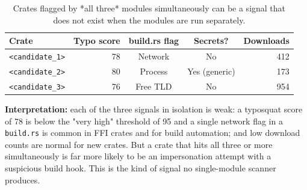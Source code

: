 \begin{table}[ht]
\centering
\caption{Crates flagged by *all three* modules simultaneously can be a signal that does not exist when the modules are run separately.}\label{tab:cross-module}
\begin{tabular}{|l|r|c|c|r|}
\hline
\textbf{Crate} & \textbf{Typo score} & \textbf{build.rs flag} & \textbf{Secrets?} & \textbf{Downloads} \\
\hline
\texttt{<candidate\_1>} & 78 & Network & No & 412 \\
\texttt{<candidate\_2>} & 80 & Process & Yes (generic) & 173 \\
\texttt{<candidate\_3>} & 76 & Free TLD & No & 954 \\
\hline
\end{tabular}
\end{table}

\textbf{Interpretation:} each of the three signals in isolation is weak: a typosquat score of 78 is below the "very high" threshold of 95 and a single network flag in a \texttt{build.rs} is common in FFI crates and for build automation; and low download counts are normal for new crates. But a crate that hits all three or more simultaneously is far more likely to be an impersonation attempt with a suspicious build hook. This is the kind of signal no single-module scanner produces.



